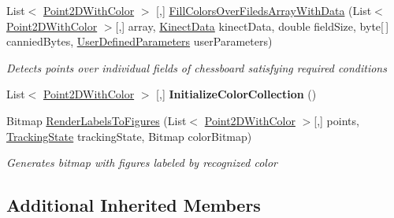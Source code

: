 \begin{DoxyCompactItemize}
List$<$ \mbox{\hyperlink{struct_chess_tracking_1_1_image_processing_1_1_pipeline_data_1_1_point2_d_with_color}{Point2\+D\+With\+Color}} $>$ \mbox{[},\mbox{]} \mbox{\hyperlink{class_chess_tracking_1_1_image_processing_1_1_figures_algorithms_1_1_figures_localization_algorithm_a5a56335c222661b583bc3600df741531}{Fill\+Colors\+Over\+Fileds\+Array\+With\+Data}} (List$<$ \mbox{\hyperlink{struct_chess_tracking_1_1_image_processing_1_1_pipeline_data_1_1_point2_d_with_color}{Point2\+D\+With\+Color}} $>$\mbox{[},\mbox{]} array, \mbox{\hyperlink{class_chess_tracking_1_1_image_processing_1_1_pipeline_data_1_1_kinect_data}{Kinect\+Data}} kinect\+Data, double field\+Size, byte\mbox{[}$\,$\mbox{]} cannied\+Bytes, \mbox{\hyperlink{class_chess_tracking_1_1_image_processing_1_1_pipeline_data_1_1_user_defined_parameters}{User\+Defined\+Parameters}} user\+Parameters)
\begin{DoxyCompactList}\small\item\em Detects points over individual fields of chessboard satisfying required conditions \end{DoxyCompactList}\item 
\mbox{\label{class_chess_tracking_1_1_image_processing_1_1_figures_algorithms_1_1_figures_localization_algorithm_a507772734019f2e7926d6f513e601574}} 
List$<$ \mbox{\hyperlink{struct_chess_tracking_1_1_image_processing_1_1_pipeline_data_1_1_point2_d_with_color}{Point2\+D\+With\+Color}} $>$ \mbox{[},\mbox{]} {\bfseries Initialize\+Color\+Collection} ()
\item 
Bitmap \mbox{\hyperlink{class_chess_tracking_1_1_image_processing_1_1_figures_algorithms_1_1_figures_localization_algorithm_ada26faa67eef9d5375afdece54b09688}{Render\+Labels\+To\+Figures}} (List$<$ \mbox{\hyperlink{struct_chess_tracking_1_1_image_processing_1_1_pipeline_data_1_1_point2_d_with_color}{Point2\+D\+With\+Color}} $>$\mbox{[},\mbox{]} points, \mbox{\hyperlink{class_chess_tracking_1_1_multithreading_messages_1_1_tracking_state}{Tracking\+State}} tracking\+State, Bitmap color\+Bitmap)
\begin{DoxyCompactList}\small\item\em Generates bitmap with figures labeled by recognized color \end{DoxyCompactList}\end{DoxyCompactItemize}
\subsection*{Additional Inherited Members}


